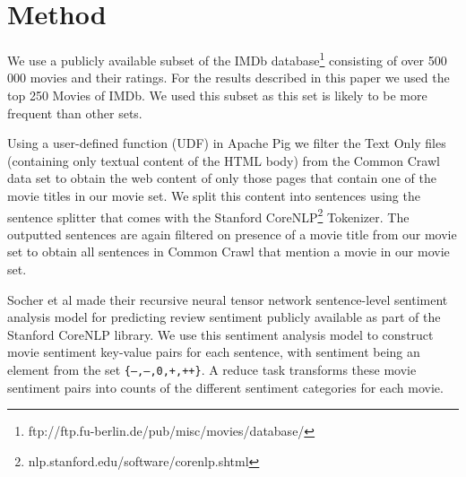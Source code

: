\documentclass{acm_proc_article-sp}
\begin{document}
\section{Method}
We use a publicly available subset of the IMDb database\footnote{ftp://ftp.fu-berlin.de/pub/misc/movies/database/} consisting of over 500 000 movies and their ratings. For the results described in this paper we used the top 250 Movies of IMDb. We used this subset as this set is likely to be more frequent than other sets.

Using a user-defined function (UDF) in Apache Pig we filter the Text Only files (containing only textual content of the HTML body) from the Common Crawl data set to obtain the web content of only those pages that contain one of the movie titles in our movie set. We split this content into sentences using the sentence splitter that comes with the Stanford CoreNLP\footnote{nlp.stanford.edu/software/corenlp.shtml} Tokenizer. The outputted sentences are again filtered on presence of a movie title from our movie set to obtain all sentences in Common Crawl that mention a movie in our movie set.

Socher et al \cite{Socher2013} made their recursive neural tensor network sentence-level sentiment analysis model for predicting review sentiment publicly available as part of the Stanford CoreNLP library. We use this sentiment analysis model to construct movie sentiment key-value pairs for each sentence, with sentiment being an element from the set \texttt{\{\mbox{---},--,0,+,\mbox{++}\}}. A reduce task transforms these movie sentiment pairs into counts of the different sentiment categories for each movie. 
\end{document}
